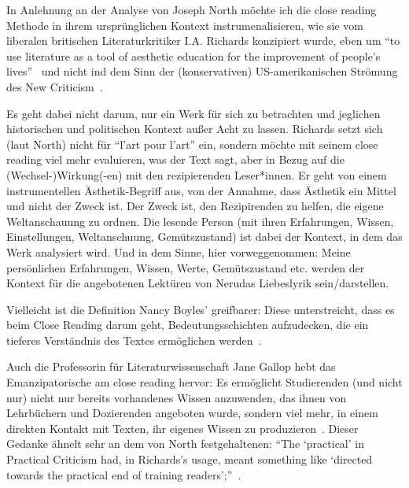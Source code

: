 In Anlehnung an der Analyse von Joseph North möchte ich die close reading Methode in ihrem ursprünglichen Kontext instrumenalisieren, wie sie vom liberalen britischen Literaturkritiker I.A. Richards konzipiert wurde, eben um ``to use literature as a tool of aesthetic education for the improvement of people's lives''~\cite{North2013}
und nicht ind dem Sinn der (konservativen) US-amerikanischen Strömung des New Criticism~\cite{North2013}.

Es geht dabei nicht darum, nur ein Werk für sich zu betrachten und jeglichen historischen und politischen Kontext außer Acht zu lassen.
Richards setzt sich (laut North) nicht für ``l'art pour l'art'' ein, sondern möchte mit seinem close reading viel mehr evaluieren, was der Text sagt, aber in Bezug auf die (Wechsel-)Wirkung(-en) mit den rezipierenden Leser*innen.
Er geht von einem instrumentellen Ästhetik-Begriff aus, von der Annahme, dass Ästhetik ein Mittel und nicht der Zweck ist.
Der Zweck ist, den Rezipirenden zu helfen, die eigene Weltanschauung zu ordnen.
Die lesende Person (mit ihren Erfahrungen, Wissen, Einstellungen, Weltanschuung, Gemütszustand) ist dabei der Kontext, in dem das Werk analysiert wird.
Und in dem Sinne, hier vorweggenommen:
Meine persönlichen Erfahrungen, Wissen, Werte, Gemütszustand etc. werden der Kontext für die angebotenen Lektüren von Nerudas Liebeslyrik sein/darstellen.

Vielleicht ist die Definition Nancy Boyles' greifbarer: 
Diese unterstreicht, dass es beim Close Reading darum geht, Bedeutungsschichten aufzudecken, die ein tieferes Verständnis des Textes ermöglichen werden~\cite[90]{Boyles2016}.

Auch die Professorin für Literaturwissenschaft Jane Gallop hebt das Emanzipatorische am close reading hervor:
Es ermöglicht Studierenden (und nicht nur) nicht nur bereits vorhandenes Wissen anzuwenden, das ihnen von Lehrbüchern und Dozierenden angeboten wurde, sondern viel mehr, in einem direkten Kontakt mit Texten, ihr eigenes Wissen zu produzieren~\cite{Gallop2007}.
Dieser Gedanke ähnelt sehr an dem von North festgehaltenen: ``The `practical' in Practical Criticism had, in Richards’s usage, meant something like `directed towards the practical end of training readers';''~\cite{North2013}.


